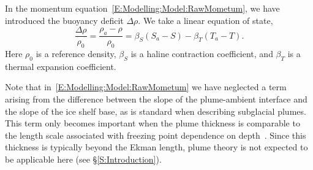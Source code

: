 \documentclass[openacc]{rsproca_new}%
\begin{document}
In the momentum equation~\eqref{E:Modelling:Model:RawMometum}, we have introduced the buoyancy deficit $\Delta \rho$. We take a linear equation of state,
\begin{equation}\label{E:Modelling:Model:EquationOfState}
\frac{\Delta \rho}{\rho_0}  = \frac{\rho_a - \rho}{\rho_0}= \beta_S(S_a - S) - \beta_T (T_a - T).
\end{equation}
Here $\rho_0$ is a reference density, $\beta_S$ is a haline contraction coefficient, and $\beta_T$ is a thermal expansion coefficient. 

Note that in~\eqref{E:Modelling:Model:RawMometum} we have neglected a term arising from the difference between the slope of the plume-ambient interface and the slope of the ice shelf base, as is standard when describing subglacial plumes. This term only becomes important when the plume thickness is comparable to the length scale associated with freezing point dependence on depth~\citep{Jenkins2011JPhysOcean}. Since this thickness is typically beyond the Ekman length, plume theory is not expected to be applicable here (see \S\ref{S:Introduction}).
\end{document}
